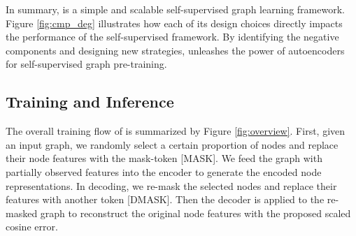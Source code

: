 


















In summary, \model is a simple and scalable self-supervised graph learning framework. 
Figure \ref{fig:cmp_deg} illustrates how each of its design choices directly impacts the performance of the self-supervised \model framework. 
By identifying the negative components and designing new strategies, \model unleashes the power of autoencoders for self-supervised graph pre-training. 














\subsection{Training and Inference}
The overall training flow of \model  is summarized by Figure \ref{fig:overview}.
First, given an input graph, we randomly select a certain proportion of nodes and replace their node features with the mask-token [MASK]. 
We feed the graph with partially observed features into the encoder to generate the encoded node representations. 
In decoding, we re-mask the selected nodes and replace their features with another token [DMASK]. Then the decoder is applied to the re-masked graph to reconstruct the original node features with the proposed scaled cosine error. 


